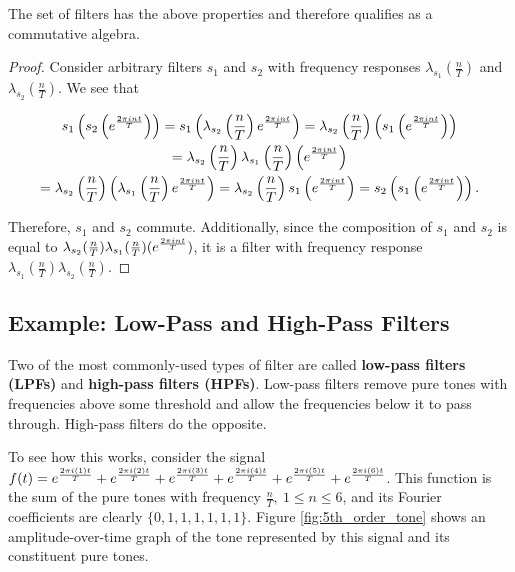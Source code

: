 \begin{theorem}
    The set of filters has the above properties and therefore qualifies as a commutative algebra.

    \begin{proof}
        Consider arbitrary filters $s_1$ and $s_2$ with frequency responses $\lambda_{s_1}(\frac{n}{T})$ and $\lambda_{s_2}(\frac{n}{T})$. We see that
        
        \begin{multline*}
            s_1\left(s_2\left(e^{\frac{2 \pi i nt}{T}}\right)\right) = s_1\left(\lambda_{s_2}\left(\frac{n}{T}\right)e^{\frac{2 \pi i nt}{T}}\right) = \lambda_{s_2}\left(\frac{n}{T}\right)\left(s_1\left(e^{\frac{2 \pi i nt}{T}}\right)\right) \\= \lambda_{s_2}\left(\frac{n}{T}\right)\lambda_{s_1}\left(\frac{n}{T}\right)\left(e^{\frac{2 \pi i nt}{T}}\right) \\= \lambda_{s_2}\left(\frac{n}{T}\right)\left(\lambda_{s_1}\left(\frac{n}{T}\right)e^{\frac{2 \pi i nt}{T}}\right) = \lambda_{s_2}\left(\frac{n}{T}\right)s_1\left(e^{\frac{2 \pi i nt}{T}}\right) = s_2\left(s_1\left(e^{\frac{2 \pi i nt}{T}}\right)\right).
        \end{multline*}
        
        Therefore, $s_1$ and $s_2$ commute. Additionally, since the composition of $s_1$ and $s_2$ is equal to $\lambda_{s_2}(\frac{n}{T})\lambda_{s_1}(\frac{n}{T})(e^{\frac{2 \pi i nt}{T}})$, it is a filter with frequency response $\lambda_{s_1}(\frac{n}{T}) \lambda_{s_2}(\frac{n}{T})$.
    \end{proof}
\end{theorem}

\newpage

\subsection{Example: Low-Pass and High-Pass Filters}

\par \indentt Two of the most commonly-used types of filter are called \textbf{low-pass filters (LPFs)} and \textbf{high-pass filters (HPFs)}. Low-pass filters remove pure tones with frequencies above some threshold and allow the frequencies below it to pass through. High-pass filters do the opposite.

\par \bigskip To see how this works, consider the signal $f(t) = e^{\frac{2 \pi i (1)t}{T}} + e^{\frac{2 \pi i (2)t}{T}} + e^{\frac{2 \pi i (3)t}{T}} + e^{\frac{2 \pi i (4)t}{T}} + e^{\frac{2 \pi i (5)t}{T}} + e^{\frac{2 \pi i (6)t}{T}}$. This function is the sum of the pure tones with frequency $\frac{n}{T},~1 \le n \le 6$, and its Fourier coefficients are clearly $\{0,1,1,1,1,1,1\}$. Figure \ref{fig:5th_order_tone} shows an amplitude-over-time graph of the tone represented by this signal and its constituent pure tones.

